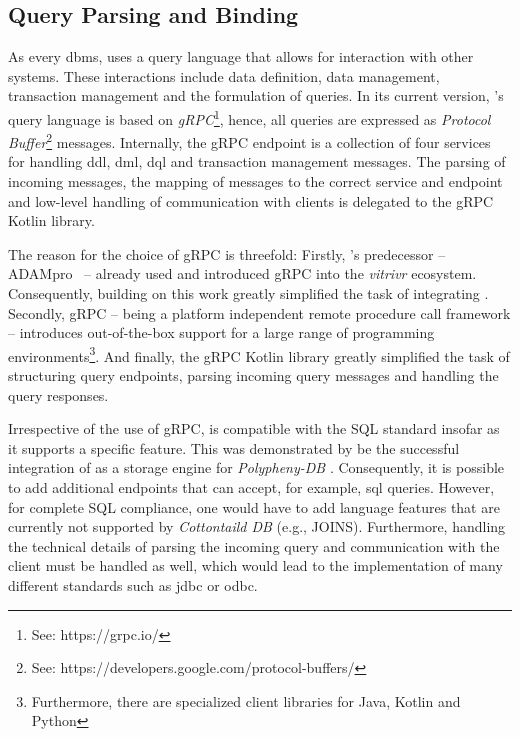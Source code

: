 \subsection{Query Parsing and Binding}
As every \acrshort{dbms}, \cottontail{} uses a query language that allows for interaction with other systems. These interactions include data definition, data management, transaction management and the formulation of queries. In its current version, \cottontail{}'s query language is based on \emph{gRPC}\footnote{See: https://grpc.io/}, hence, all queries are expressed as \emph{Protocol Buffer}\footnote{See: https://developers.google.com/protocol-buffers/} messages. Internally, the gRPC endpoint is a collection of four services for handling \acrshort{ddl}, \acrshort{dml}, \acrshort{dql} and transaction management messages. The parsing of incoming messages, the mapping of messages to the correct service and endpoint and low-level handling of communication with clients is delegated to the gRPC Kotlin library. 

The reason for the choice of gRPC is threefold: Firstly, \cottontail{}'s predecessor -- ADAMpro~\cite{Giangreco:2016adam} -- already used and introduced gRPC into the \emph{vitrivr} ecosystem. Consequently, building on this work greatly simplified the task of integrating \cottontail{}. Secondly, gRPC -- being a platform independent remote procedure call framework -- introduces out-of-the-box support for a large range of programming environments\footnote{Furthermore, there are specialized client libraries for Java, Kotlin and Python}. And finally, the gRPC Kotlin library greatly simplified the task of structuring query endpoints, parsing incoming query messages and handling the query responses.

Irrespective of the use of gRPC, \cottontail{} is compatible with the SQL standard insofar as it supports a specific feature. This was demonstrated by be the successful integration of \cottontail{} as a storage engine for \emph{Polypheny-DB} . Consequently, it is possible to add additional endpoints that can accept, for example, \acrshort{sql} queries. However, for complete SQL compliance, one would have to add language features that are currently not supported by \emph{Cottontaild DB} (e.g., JOINS). Furthermore, handling the technical details of parsing the incoming query and communication with the client must be handled as well, which would lead to the implementation of many different standards such as \acrshort{jdbc} or \acrshort{odbc}.

